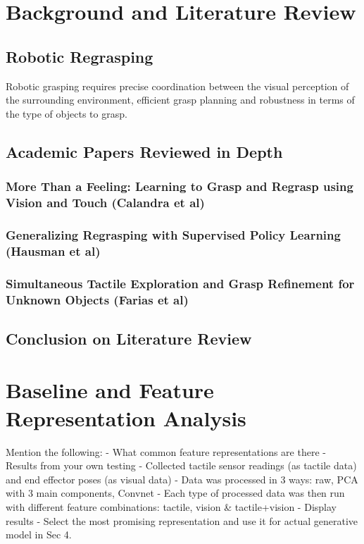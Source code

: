 \documentclass[a4paper]{report}
\theoremstyle{definition}
\begin{document}
\chapter{Background and Literature Review}
\label{chap:2}
\section{Robotic Regrasping}
\label{sec:2.1}
Robotic grasping requires precise coordination between the visual perception of the surrounding environment, efficient grasp planning and robustness in terms of the type of objects to grasp. 
\section{Academic Papers Reviewed in Depth}
\label{}
\subsection{More Than a Feeling: Learning to Grasp and Regrasp using Vision and Touch (Calandra et al)\cite{calandra}}
\label{}
\subsection{Generalizing Regrasping with Supervised Policy Learning (Hausman et al)\cite{hausman}}
\label{}
\subsection{Simultaneous Tactile Exploration and Grasp Refinement for Unknown Objects (Farias et al)\cite{farias}}
\label{}
\section{Conclusion on Literature Review}


\chapter{Baseline and Feature Representation Analysis}
\label{chap:3}
Mention the following:
- What common feature representations are there
- Results from your own testing
    - Collected tactile sensor readings (as tactile data) and end effector poses (as visual data)
    - Data was processed in 3 ways: raw, PCA with 3 main components, Convnet
    - Each type of processed data was then run with different feature combinations: tactile, vision \& tactile+vision
    - Display results
- Select the most promising representation and use it for actual generative model in Sec 4.
\end{document}
